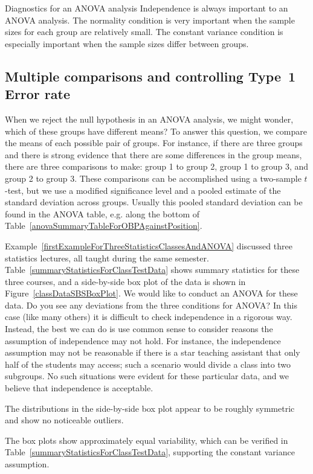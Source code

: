 \begin{caution}{Diagnostics for an ANOVA analysis}
{Independence is always important to an ANOVA analysis. The normality condition is very important when the sample sizes for each group are relatively small. The constant variance condition is especially important when the sample sizes differ between groups.}
\end{caution}


\subsection{Multiple comparisons and controlling Type~1 Error rate}
\label{multipleComparisonsAndControllingTheType1ErrorRate}


When we reject the null hypothesis in an ANOVA analysis, we might wonder, which of these groups have different means? To answer this question, we compare the means of each possible pair of groups. For instance, if there are three groups and there is strong evidence that there are some differences in the group means, there are three comparisons to make: group 1 to group 2, group 1 to group 3, and group 2 to group 3. These comparisons can be accomplished using a two-sample $t$-test, but we use a modified significance level and a pooled estimate of the standard deviation across groups. Usually this pooled standard deviation can be found in the ANOVA table, e.g. along the bottom of Table~\ref{anovaSummaryTableForOBPAgainstPosition}.

\textA{\newpage}

\begin{example}{Example~\vref{firstExampleForThreeStatisticsClassesAndANOVA} discussed three statistics lectures, all taught during the same semester. Table~\ref{summaryStatisticsForClassTestData} shows summary statistics for these three courses, and a side-by-side box plot of the data is shown in Figure~\ref{classDataSBSBoxPlot}. We would like to conduct an ANOVA for these data. Do you see any deviations from the three conditions for ANOVA?}
In this case (like many others) it is difficult to check independence in a rigorous way. Instead, the best we can do is use common sense to consider reasons the assumption of independence may not hold. For instance, the independence assumption may not be reasonable if there is a star teaching assistant that only half of the students may access; such a scenario would divide a class into two subgroups. No such situations were evident for these particular data, and we believe that independence is acceptable.

The distributions in the side-by-side box plot appear to be roughly symmetric and show no noticeable outliers.

The box plots show approximately equal variability, which can be verified in Table~\ref{summaryStatisticsForClassTestData}, supporting the constant variance assumption.
\end{example}

